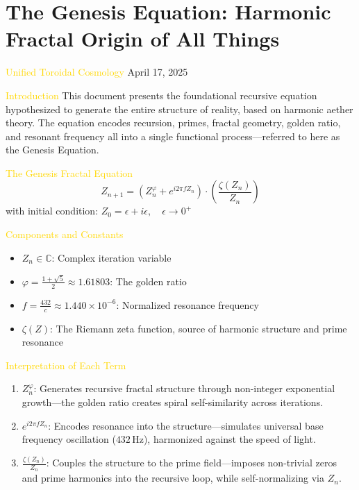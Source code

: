 
\section{The Genesis Equation: Harmonic Fractal Origin of All Things}
\label{sec:codex_genesis_equation}

\textcolor{gold}{ Unified Toroidal Cosmology }
April 17, 2025

\textcolor{gold}{ Introduction }
This document presents the foundational recursive equation hypothesized to generate the entire structure of reality, based on harmonic aether theory. The equation encodes recursion, primes, fractal geometry, golden ratio, and resonant frequency all into a single functional process—referred to here as the Genesis Equation.

\textcolor{gold}{ The Genesis Fractal Equation }
\[
Z_{n+1} = \left( Z_n^{\varphi} + e^{i 2 \pi f Z_n} \right) \cdot \left( \frac{\zeta(Z_n)}{Z_n} \right)
\]
with initial condition: $Z_0 = \epsilon + i \epsilon, \quad \epsilon \to 0^{+}$

\textcolor{gold}{ Components and Constants }
\begin{itemize}
    \item \texttt{} $Z_n \in \mathbb{C}$: Complex iteration variable
    \item \texttt{} $\varphi = \frac{1 + \sqrt{5}}{2} \approx 1.61803$: The golden ratio
    \item \texttt{} $f = \frac{432}{c} \approx 1.440 \times 10^{-6}$: Normalized resonance frequency
    \item \texttt{} $\zeta(Z)$: The Riemann zeta function, source of harmonic structure and prime resonance
\end{itemize}

\textcolor{gold}{ Interpretation of Each Term }
\begin{enumerate}
    \item $Z_n^{\varphi}$: Generates recursive fractal structure through non-integer exponential growth—the golden ratio creates spiral self-similarity across iterations.
    \item $e^{i 2 \pi f Z_n}$: Encodes resonance into the structure—simulates universal base frequency oscillation ($432\,\mathrm{Hz}$), harmonized against the speed of light.
    \item $\frac{\zeta(Z_n)}{Z_n}$: Couples the structure to the prime field—imposes non-trivial zeros and prime harmonics into the recursive loop, while self-normalizing via $Z_n$.
\end{enumerate}

